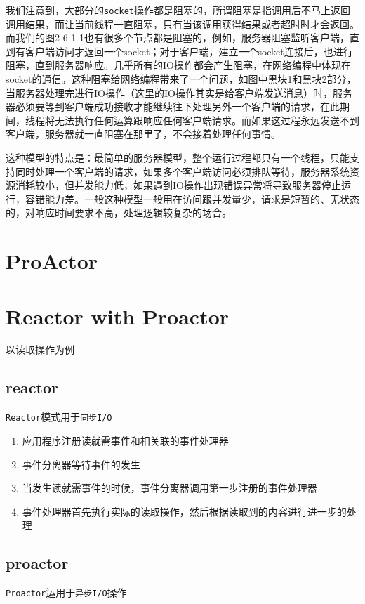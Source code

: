 \documentclass[UTF8,a4paper,8pt]{ctexbook}
\begin{document}
		我们注意到，大部分的\verb|socket|操作都是阻塞的，所谓阻塞是指调用后不马上返回调用结果，而让当前线程一直阻塞，只有当该调用获得结果或者超时时才会返回。而我们的图2-6-1-1也有很多个节点都是阻塞的，例如，服务器阻塞监听客户端，直到有客户端访问才返回一个socket；对于客户端，建立一个socket连接后，也进行阻塞，直到服务器响应。几乎所有的IO操作都会产生阻塞，在网络编程中体现在socket的通信。这种阻塞给网络编程带来了一个问题，如图中黑块1和黑块2部分，当服务器处理完进行IO操作（这里的IO操作其实是给客户端发送消息）时，服务器必须要等到客户端成功接收才能继续往下处理另外一个客户端的请求，在此期间，线程将无法执行任何运算跟响应任何客户端请求。而如果这过程永远发送不到客户端，服务器就一直阻塞在那里了，不会接着处理任何事情。
		
		这种模型的特点是：最简单的服务器模型，整个运行过程都只有一个线程，只能支持同时处理一个客户端的请求，如果多个客户端访问必须排队等待，服务器系统资源消耗较小，但并发能力低，如果遇到IO操作出现错误异常将导致服务器停止运行，容错能力差。一般这种模型一般用在访问跟并发量少，请求是短暂的、无状态的，对响应时间要求不高，处理逻辑较复杂的场合。

	\section{ProActor}
	
	
	\section{Reactor with Proactor}
		以读取操作为例
		
		\subsection{reactor}
			\verb|Reactor|模式用于\verb|同步I/O|
			
			\begin{enumerate}
				\item 应用程序注册读就需事件和相关联的事件处理器
				\item 事件分离器等待事件的发生
				\item 当发生读就需事件的时候，事件分离器调用第一步注册的事件处理器
				\item 事件处理器首先执行实际的读取操作，然后根据读取到的内容进行进一步的处理
			\end{enumerate}
		
		\subsection{proactor}
			\verb|Proactor|运用于\verb|异步I/O|操作
			
\end{document}
